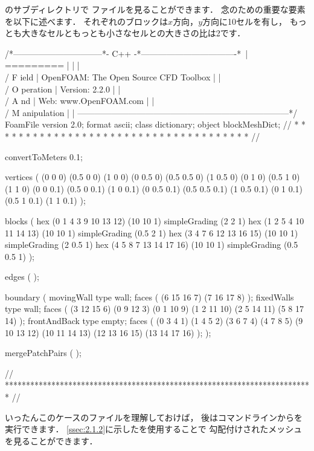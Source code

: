 のサブディレクトリで
ファイルを見ることができます．
念のための重要な要素を以下に述べます．
それぞれのブロックは$x$方向，$y$方向に10セルを有し，
もっとも大きなセルともっとも小さなセルとの大きさの比は2です．
\begin{OFverbatim}[file, linenum=17]
/*--------------------------------*- C++ -*----------------------------------*\
| =========                 |                                                 |
| \\      /  F ield         | OpenFOAM: The Open Source CFD Toolbox           |
|  \\    /   O peration     | Version:  2.2.0                                 |
|   \\  /    A nd           | Web:      www.OpenFOAM.com                      |
|    \\/     M anipulation  |                                                 |
\*---------------------------------------------------------------------------*/
FoamFile
{
    version     2.0;
    format      ascii;
    class       dictionary;
    object      blockMeshDict;
}
// * * * * * * * * * * * * * * * * * * * * * * * * * * * * * * * * * * * * * //

convertToMeters 0.1;

vertices        
(
    (0 0 0)
    (0.5 0 0)
    (1 0 0)
    (0 0.5 0)
    (0.5 0.5 0)
    (1 0.5 0)
    (0 1 0)
    (0.5 1 0)
    (1 1 0)
    (0 0 0.1)
    (0.5 0 0.1)
    (1 0 0.1)
    (0 0.5 0.1)
    (0.5 0.5 0.1)
    (1 0.5 0.1)
    (0 1 0.1)
    (0.5 1 0.1)
    (1 1 0.1)
);

blocks          
(
    hex (0 1 4 3 9 10 13 12) (10 10 1) simpleGrading (2 2 1)
    hex (1 2 5 4 10 11 14 13) (10 10 1) simpleGrading (0.5 2 1)
    hex (3 4 7 6 12 13 16 15) (10 10 1) simpleGrading (2 0.5 1)
    hex (4 5 8 7 13 14 17 16) (10 10 1) simpleGrading (0.5 0.5 1)
);

edges           
(
);

boundary
(
    movingWall
    {
        type wall;
        faces
        (
            (6 15 16 7)
            (7 16 17 8)
        );
    }
    fixedWalls
    {
        type wall;
        faces
        (
            (3 12 15 6)
            (0 9 12 3)
            (0 1 10 9)
            (1 2 11 10)
            (2 5 14 11)
            (5 8 17 14)
        );
    }
    frontAndBack
    {
        type empty;
        faces
        (
            (0 3 4 1)
            (1 4 5 2)
            (3 6 7 4)
            (4 7 8 5)
            (9 10 13 12)
            (10 11 14 13)
            (12 13 16 15)
            (13 14 17 16)
        );
    }
);

mergePatchPairs
(
);

// ************************************************************************* //
\end{OFverbatim}
いったんこのケースのファイルを理解しておけば，
後はコマンドラインからを実行できます．
\autoref{ssec:2.1.2}に示したを使用することで
勾配付けされたメッシュを見ることができます．

